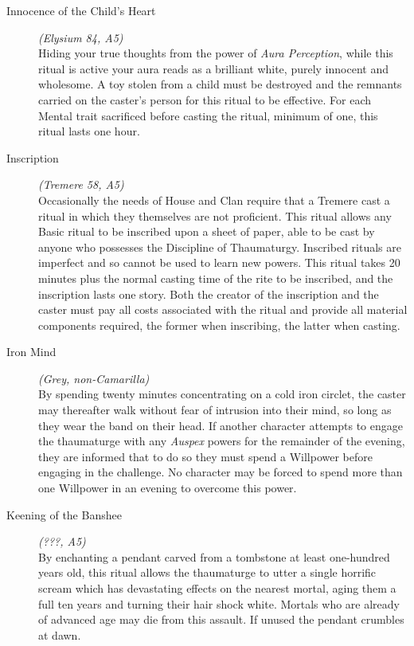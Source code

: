 \begin{description}
	\item[Innocence of the Child's Heart] \emph{(Elysium 84, A5)} \hfill \\
	Hiding your true thoughts from the power of \emph{Aura Perception}, while this ritual is active your aura reads as a brilliant white, 
	purely innocent and wholesome.  A toy stolen from a child must be destroyed and the remnants carried on the caster's person for this 
	ritual to be effective.  For each Mental trait sacrificed before casting the ritual, minimum of one, this ritual lasts one hour. \\
	
	\item[Inscription] \emph{(Tremere 58, A5)} \hfill \\
	Occasionally the needs of House and Clan require that a Tremere cast a ritual in which they themselves are not proficient.  
	This ritual allows any Basic ritual to be inscribed upon a sheet of paper, able to be cast by anyone who possesses the 
	Discipline of Thaumaturgy.  Inscribed rituals are imperfect and so cannot be used to learn new powers. This ritual takes 
	20 minutes plus the normal casting time of the rite to be inscribed, and the inscription lasts one story.  Both the creator 
	of the inscription and the caster must pay all costs associated with the ritual and provide all material components  
	required, the former when inscribing, the latter when casting. \\

	\item[Iron Mind] \emph{(Grey, non-Camarilla)} \hfill \\
	By spending twenty minutes concentrating on a cold iron circlet, the caster may thereafter walk without fear of intrusion into their 
	mind, so long as they wear the band on their head.  If another character attempts to engage the thaumaturge with any \emph{Auspex} 
	powers for the remainder of the evening, they are informed that to do so they must spend a Willpower before engaging in the 
	challenge.  No character may be forced to spend more than one Willpower in an evening to overcome this power. \\

	\item[Keening of the Banshee] \emph{(???, A5)} \hfill \\
	By enchanting a pendant carved from a tombstone at least one-hundred years old, this ritual allows the thaumaturge to utter a 
	single horrific scream which has devastating effects on the nearest mortal, aging them a full ten years and turning their hair 
	shock white.  Mortals who are already of advanced age may die from this assault.  If unused the pendant crumbles at dawn. \\


\end{description}
